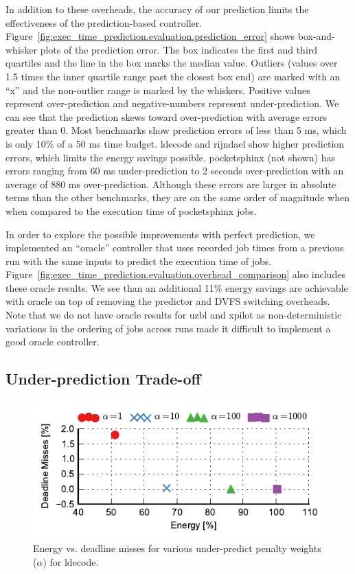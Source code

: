 In addition to these overheads, the accuracy of our prediction limits the
effectiveness of the prediction-based controller.
Figure~\ref{fig:exec_time_prediction.evaluation.prediction_error} shows
box-and-whisker plots of the prediction error.  The box indicates the first and
third quartiles and the line in the box marks the median value. Outliers
(values over 1.5 times the inner quartile range past the closest box end) are
marked with an ``x'' and the non-outlier range is marked by the whiskers.
Positive values represent over-prediction and negative-numbers represent
under-prediction. We can see that the prediction skews toward over-prediction
with average errors greater than 0.  Most benchmarks show prediction errors of
less than 5 ms, which is only 10\% of a 50 ms time budget. ldecode and rijndael
show higher prediction errors, which limits the energy savings possible.
pocketsphinx (not shown) has errors ranging from 60 ms under-prediction to 2
seconds over-prediction with an average of 880 ms over-prediction. Although
these errors are larger in absolute terms than the other benchmarks, they are
on the same order of magnitude when when compared to the execution time of
pocketsphinx jobs.

In order to explore the possible improvements with perfect prediction, we
implemented an ``oracle'' controller that uses recorded job times from a
previous run with the same inputs to predict the execution time of jobs.
Figure~\ref{fig:exec_time_prediction.evaluation.overhead_comparison} also
includes these oracle results. We see than an additional 11\% energy savings
are achievable with oracle on top of removing the predictor and DVFS switching
overheads. Note that we do not have oracle results for uzbl and xpilot as
non-deterministic variations in the ordering of jobs across runs made it
difficult to implement a good oracle controller.

\subsection{Under-prediction Trade-off}

\begin{figure}
  \begin{center}
    \includegraphics{exec_time_prediction/data/underpredict_sweep.pdf}
    \caption{Energy vs. deadline misses for various under-predict penalty
    weights ($\alpha$) for ldecode.}
    \label{fig:exec_time_prediction.evaluation.underpredict_sweep}
  \end{center}
\end{figure}

